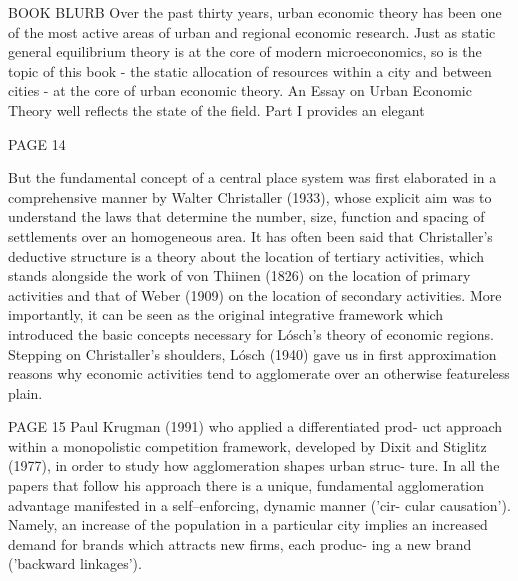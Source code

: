 BOOK BLURB
Over the past thirty years, urban economic theory has been one of the most active areas of urban and regional economic research. Just as static general equilibrium theory is at the core of modern microeconomics, so is the topic of this book - the static allocation of resources within a city and between cities - at the core of urban economic theory. An Essay on Urban Economic Theory well reflects the state of the field. Part I provides an elegant

PAGE 14

But the fundamental concept of a central place system was first elaborated in a comprehensive manner by Walter Christaller (1933), whose explicit aim was to understand the laws that determine the number, size, function and spacing of settlements over an homogeneous area. It has often been said that Christaller's deductive structure is a theory about the location of tertiary activities, which stands alongside the work of von Thiinen (1826) on the location of primary activities and that of Weber (1909) on the location of secondary activities. More importantly, it can be seen as the original integrative framework which introduced the basic concepts necessary for L\'osch's theory of economic regions. Stepping on Christaller's shoulders, L\'osch (1940) gave us in first approximation reasons why economic activities tend to agglomerate over an otherwise featureless plain. 

PAGE 15  Paul Krugman (1991) who applied a differentiated prod- uct approach within a monopolistic competition framework, developed by Dixit and Stiglitz (1977), in order to study how agglomeration shapes urban struc- ture. In all the papers that follow his approach there is a unique, fundamental agglomeration advantage manifested in a self--enforcing, dynamic manner ('cir- cular causation'). Namely, an increase of the population in a particular city implies an increased demand for brands which attracts new firms, each produc- ing a new brand ('backward linkages').